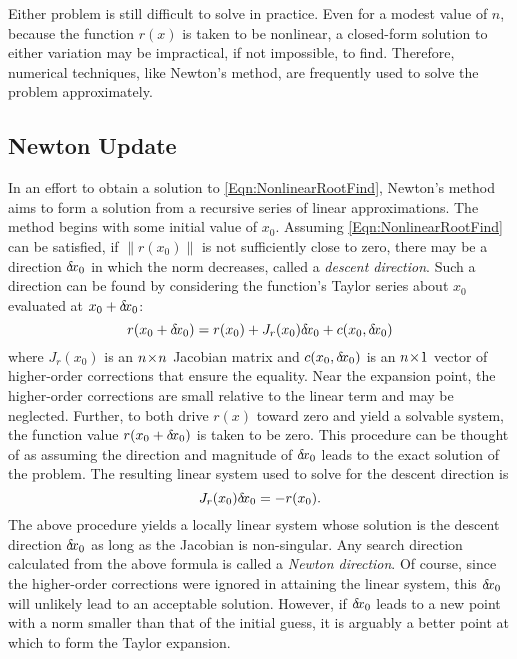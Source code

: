 \documentclass[12pt]{UWMadThesis}
\begin{document}
Either problem is still difficult to solve in practice.
Even for a modest value of $n$, because the function $r(x)$ is taken to be nonlinear, a closed-form solution to either variation may be impractical, if not impossible, to find.
Therefore, numerical techniques, like Newton's method, are frequently used to solve the problem approximately.





\subsection{Newton Update}
In an effort to obtain a solution to \cref{Eqn:NonlinearRootFind}, Newton's method aims to form a solution from a recursive series of linear approximations.
The method begins with some initial value of $x_0$.
Assuming \cref{Eqn:NonlinearRootFind} can be satisfied, if $\|r(x_0)\|$ is not sufficiently close to zero, there may be a direction $\delta \mkern-3.00mu x_0$ in which the norm decreases, called a \textit{descent direction}.
Such a direction can be found by considering the function's Taylor series about $x_0$ evaluated at $x_0 + \delta \mkern-3.00mu x_0$:
\begin{equation}
    r(x_0 + \delta \mkern-3.00mu x_0) =  r(x_0) + J_r(x_0)\delta \mkern-3.00mu x_0 + c(x_0,\delta \mkern-3.00mu x_0)
\end{equation}
where $J_r(x_0)$ is an $n \!\times\! n$ Jacobian matrix and $c(x_0,\delta \mkern-3.00mu x_0)$ is an $n \!\times\! 1$ vector of higher-order corrections that ensure the equality.
Near the expansion point, the higher-order corrections are small relative to the linear term and may be neglected.
Further, to both drive $r(x)$ toward zero and yield a solvable system, the function value $r(x_0 + \delta \mkern-3.00mu x_0)$ is taken to be zero.
This procedure can be thought of as assuming the direction and magnitude of $\delta \mkern-3.00mu x_0$ leads to the exact solution of the problem.
The resulting linear system used to solve for the descent direction is
\begin{equation}
    J_{r}(x_0) \delta \mkern-3.00mu x_0 = -r(x_0).
    \label{Eqn:NewtonsDirection}
\end{equation}
The above procedure yields a locally linear system whose solution is the descent direction $\delta \mkern-3.00mu x_0$ as long as the Jacobian is non-singular.
Any search direction calculated from the above formula is called a \textit{Newton direction}.
Of course, since the higher-order corrections were ignored in attaining the linear system, this $\delta \mkern-3.00mu x_0$ will unlikely lead to an acceptable solution.
However, if $\delta \mkern-3.00mu x_0$ leads to a new point with a norm smaller than that of the initial guess, it is arguably a better point at which to form the Taylor expansion.
\end{document}

